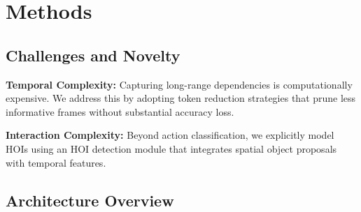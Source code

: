 \documentclass{article}
\begin{document}
\section{Methods}

\subsection{Challenges and Novelty}
\textbf{Temporal Complexity:} Capturing long-range dependencies is computationally expensive. We address this by adopting token reduction strategies that prune less informative frames without substantial accuracy loss.

\textbf{Interaction Complexity:} Beyond action classification, we explicitly model HOIs using an HOI detection module that integrates spatial object proposals with temporal features.

\subsection{Architecture Overview}
\end{document}
